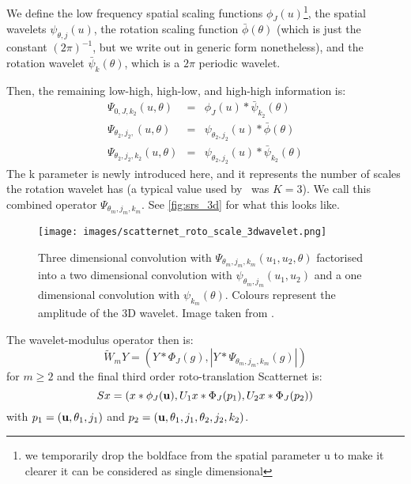   We define the low frequency spatial scaling functions $\phi_J(u)$\footnote{we
  temporarily drop the boldface from the spatial parameter u to make it clearer
  it can be considered as single dimensional}, the spatial wavelets
  $\psi_{\theta, j}(u)$, the rotation scaling function $\bar{\phi}(\theta)$
  (which is just the constant $(2\pi)^{-1}$, but we write out in generic form
  nonetheless), and the rotation wavelet $\bar{\psi}_k(\theta)$, which is
  a $2\pi$ periodic wavelet.

  Then, the remaining low-high, high-low, and high-high information is:
  \begin{eqnarray}
    \Psi_{0, J, k_2}(u, \theta) & = & \phi_J(u) \ast \bar{\psi}_{k_2}(\theta) \\
    \Psi_{\theta_2, j_2, } (u, \theta) & = & \psi_{\theta_2, j_2}(u) \ast
      \bar{\phi}(\theta) \\
    \Psi_{\theta_2, j_2, k_2}(u, \theta) & = & \psi_{\theta_2, j_2}(u) \ast
      \bar{\psi}_{k_2}(\theta)
  \end{eqnarray}
  The k parameter is newly introduced here, and it represents the number of
  scales the rotation wavelet has (a typical value used by \Sifre\ was $K=3$).
  We call this combined operator $\Psi_{\theta_m, j_m, k_m}$. See
  \autoref{fig:srs_3d} for what this looks like.

  \begin{figure}
    \centering
      \texttt{[image: images/scatternet\_roto\_scale\_3dwavelet.png]}
      \caption[Three dimensional convolution with roto-scale wavelet]
              {Three dimensional convolution with  $\Psi_{\theta_m, j_m,
              k_m}(u_1, u_2, \theta)$ factorised into a two dimensional convolution with
              $\psi_{\theta_m, j_m}(u_1, u_2)$ and a one dimensional convolution with
              $\psi_{k_m}(\theta)$. Colours represent the amplitude of the 3D
              wavelet. Image taken from \citep{sifre_rotation_2013}.}
      \label{fig:srs_3d}
  \end{figure}

  The wavelet-modulus operator then is:
  \begin{equation}
    \tilde{W}_m Y = \left( Y \ast \Phi_J(g), |Y \ast \Psi_{\theta_m, j_m, k_m}
      (g)| \right)
  \end{equation}
  for $m\ge 2$ and the final third order roto-translation Scatternet is:
  \begin{equation}
    Sx = (x\ast \phi_J(\mathbf{u}), U_1x \ast \Phi_J(p_1), U_2x \ast \Phi_J(p_2))
    \label{eq:roto_shift}
  \end{equation}
  with $p_1 = (\mathbf{u}, \theta_1, j_1)$ and $p_2=(\mathbf{u}, \theta_1, j_1,
  \theta_2, j_2, k_2)$.


